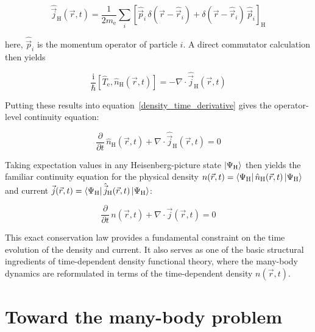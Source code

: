 \begin{equation}
    \hat{\vec{j}}_\mathrm{H}(\vec{r},t)
    = \frac{1}{2m_\mathrm{e}}\sum_i\left[\hat{\vec{p}}_i\,\delta(\vec{r}-\hat{\vec{r}}_i)+\delta(\vec{r}-\hat{\vec{r}}_i)\,\hat{\vec{p}}_i\right]_\mathrm{H}
\label{heisenberg-picture_current_operator}
\end{equation}

here, $\hat{\vec{p}}_i$ is the momentum operator of particle $i$. A direct commutator calculation then yields

\begin{equation}
    \frac{\mathrm{i}}{\hbar}\left[\hat{T}_\mathrm{e},\hat n_\mathrm{H}(\vec{r},t)\right]
    = -\nabla\cdot\hat{\vec{j}}_\mathrm{H}(\vec{r},t)
\label{direct_commutator}
\end{equation}

Putting these results into equation~\eqref{density_time_derivative} gives the operator-level continuity equation:

\begin{equation}
\frac{\partial}{\partial t}\,\hat{n}_\mathrm{H}(\vec{r},t)+\nabla\cdot\hat{\vec j}_\mathrm{H}(\vec{r},t)=0
\label{continuity_operator}
\end{equation}

Taking expectation values in any Heisenberg-picture state $\ket{\Psi_\mathrm{H}}$ then yields the familiar continuity equation for the physical density $n(\vec{r},t)=\bra{\Psi_\mathrm{H}}\hat{n}_\mathrm{H}(\vec{r},t)\ket{\Psi_\mathrm{H}}$
and current $\vec{j}(\vec{r},t)=\bra{\Psi_\mathrm{H}}\hat{\vec{j}}_\mathrm{H}(\vec{r},t)\ket{\Psi_\mathrm{H}}$:

\begin{equation}
    \frac{\partial}{\partial t}\,n(\vec{r},t)+\nabla\cdot\vec{j}(\vec{r},t)=0
\label{continuity_expectation}
\end{equation}

This exact conservation law provides a fundamental constraint on the time evolution of the density and current. It also serves as one of the basic structural ingredients of time-dependent density functional theory, where the many-body dynamics are reformulated in terms of the time-dependent density $n(\vec{r},t)$.

\newpage
\section{Toward the many-body problem}
\label{sec:toward_many_body_problem}

